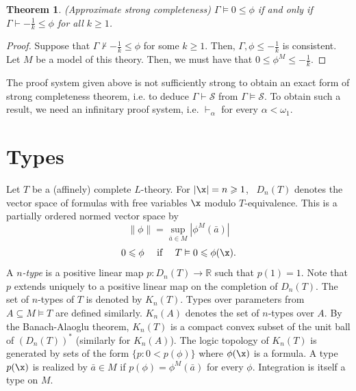 \documentclass[12pt]{article}
\newtheorem{theorem}{Theorem}[section]
\newtheorem{lemma}[theorem]{Lemma}
\def\a{\bar {a}}\def\b{\bar {b}}\def\c{\bar {c}}
\def\Rn{\mathbb R}
\def\Sc{\mathcal S}
\begin{document}
\begin{theorem} {\em (Approximate strong completeness)}
$\Gamma\vDash0\leqslant\phi$ if and only if $\Gamma\vdash-\frac{1}{k}\leqslant\phi$ for all $k\geqslant1$.
\end{theorem}
\begin{proof}
Suppose that $\Gamma\nvdash-\frac{1}{k}\leqslant\phi$ for some $k\geqslant1$.
Then, $\Gamma,\phi\leqslant-\frac{1}{k}$ is consistent. Let $M$ be a model of this theory.
Then, we must have that $0\leqslant\phi^M\leqslant-\frac{1}{k}$.
\end{proof}

The proof system given above is not sufficiently strong to obtain an exact form of strong completeness theorem,
i.e. to deduce $\Gamma\vdash\Sc$ from $\Gamma\vDash\Sc$. To obtain such a result, we need
an infinitary proof system, i.e. $\vdash_\alpha$ for every $\alpha<\omega_1$.

\section{Types} \label{Types}
Let $T$ be a (affinely) complete $L$-theory. For $|\x|=n\geqslant1$, \ $D_{n}(T)$ denotes the vector space
of formulas with free variables $\x$ modulo $T$-equivalence.
This is a partially ordered normed vector space by
$$\|\phi\|=\sup_{\a\in M}|\phi^M(\a)|$$
$$0\leqslant\phi\ \ \ \ \mbox{if} \ \ \ \ T\vDash0\leqslant\phi(\x).$$
A \emph{$n$-type} is a positive linear map $p: D_n(T)\rightarrow\Rn$ such that $p(1)=1$.
Note that $p$ extends uniquely to a positive linear map on the completion of $D_n(T)$.
The set of $n$-types of $T$ is denoted by $K_n(T)$.
Types over parameters from $A\subseteq M\vDash T$ are defined similarly. $K_n(A)$ denotes the set of $n$-types over $A$.
By the Banach-Alaoglu theorem, $K_n(T)$ is a compact convex subset of the unit ball of
$( D_n(T))^*$ (similarly for $K_n(A)$).
The logic topology of $K_n(T)$ is generated by sets of the form $\{p: 0<p(\phi)\}$ where $\phi(\x)$ is a formula.
A type $p(\x)$ is realized by $\a\in M$ if $p(\phi)=\phi^M(\a)$ for every $\phi$.
Integration is itself a type on $M$.

\end{document}
